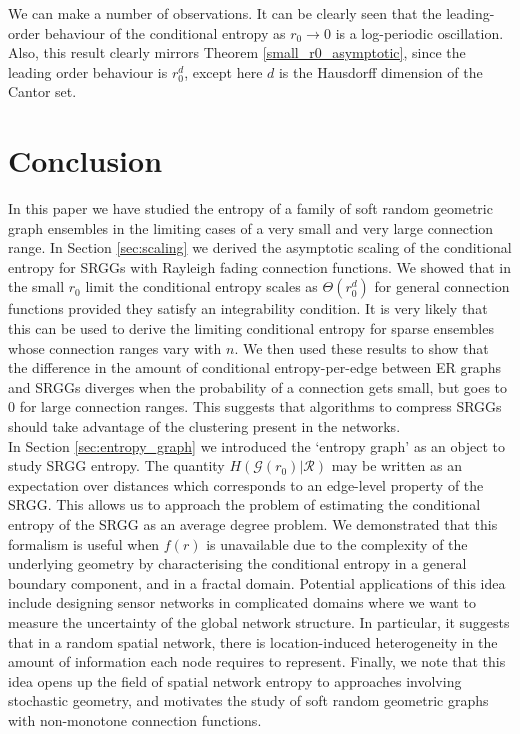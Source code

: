 \documentclass{article}
\newcommand{\graph}{\mathcal{G}}
\newcommand{\ttz}[0]{\rightarrow 0}
\begin{document}
We can make a number of observations. It can be clearly seen that the leading-order behaviour of the conditional entropy as $r_0 \ttz$ is a log-periodic oscillation. Also, this result clearly mirrors Theorem \ref{small_r0_asymptotic}, since the leading order behaviour is $r_0^d$, except here $d$ is the Hausdorff dimension of the Cantor set.


\section{Conclusion}
\label{sec:conclusion}
In this paper we have studied the entropy of a family of soft random geometric graph ensembles in the limiting cases of a very small and very large connection range. In Section \ref{sec:scaling} we derived the asymptotic scaling of the conditional entropy for SRGGs with Rayleigh fading connection functions. We showed that in the small $r_0$ limit the conditional entropy scales as $\Theta(r_0^d)$ for general connection functions provided they satisfy an integrability condition. It is very likely that this can be used to derive the limiting conditional entropy for sparse ensembles whose connection ranges vary with $n$. We then used these results to show that the difference in the amount of conditional entropy-per-edge between ER graphs and SRGGs diverges when the probability of a connection gets small, but goes to 0 for large connection ranges. This suggests that algorithms to compress SRGGs should take advantage of the clustering present in the networks. \\

In Section \ref{sec:entropy_graph} we introduced the `entropy graph' as an object to study SRGG entropy. The quantity $H(\graph(r_0)|\mathcal{R})$ may be written as an expectation over distances which corresponds to an edge-level property of the SRGG. This allows us to approach the problem of estimating the conditional entropy of the SRGG as an average degree problem. We demonstrated that this formalism is useful when $f(r)$ is unavailable due to the complexity of the underlying geometry by characterising the conditional entropy in a general boundary component, and in a fractal domain. Potential applications of this idea include designing sensor networks in complicated domains where we want to measure the uncertainty of the global network structure. In particular, it suggests that in a random spatial network, there is location-induced heterogeneity in the amount of information each node requires to represent. Finally, we note that this idea opens up the field of spatial network entropy to approaches involving stochastic geometry, and motivates the study of soft random geometric graphs with non-monotone connection functions. 
\end{document}
